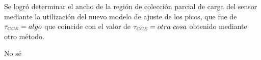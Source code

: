 Se logró determinar el ancho de la región de colección parcial de carga del sensor mediante la utilización del nuevo modelo de ajuste de los picos, que fue de $\tau_{\scaleto{CCE}{4pt}} = algo$ que coincide con el valor de $\tau_{\scaleto{CCE}{4pt}} = otra\ cosa$ obtenido mediante otro método.

No sé



